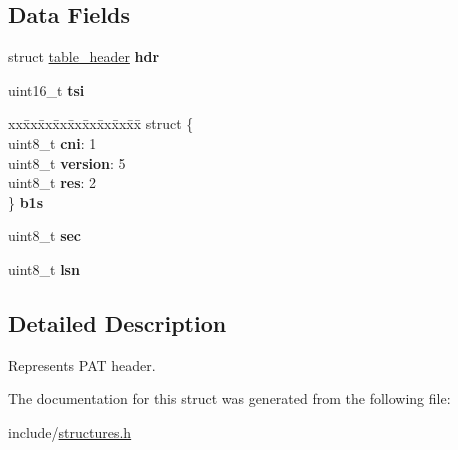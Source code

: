 \subsection*{Data Fields}
\begin{DoxyCompactItemize}
\item 
struct \hyperlink{structtable__header}{table\+\_\+header} {\bfseries hdr}\hypertarget{structpat__header_aba3506df2bd57dfea7f4eda3b31923e1}{}\label{structpat__header_aba3506df2bd57dfea7f4eda3b31923e1}

\item 
uint16\+\_\+t {\bfseries tsi}\hypertarget{structpat__header_ae911aee2f0283dfb8d45945f403a6456}{}\label{structpat__header_ae911aee2f0283dfb8d45945f403a6456}

\item 
\begin{tabbing}
xx\=xx\=xx\=xx\=xx\=xx\=xx\=xx\=xx\=\kill
struct \{\\
\>uint8\_t {\bfseries cni}: 1\\
\>uint8\_t {\bfseries version}: 5\\
\>uint8\_t {\bfseries res}: 2\\
\} {\bfseries b1s}\hypertarget{structpat__header_a212fe9c2d650280b55695b6887a87817}{}\label{structpat__header_a212fe9c2d650280b55695b6887a87817}
\\

\end{tabbing}\item 
uint8\+\_\+t {\bfseries sec}\hypertarget{structpat__header_a0bc5a3faf64ae3afcfcee271301e73f4}{}\label{structpat__header_a0bc5a3faf64ae3afcfcee271301e73f4}

\item 
uint8\+\_\+t {\bfseries lsn}\hypertarget{structpat__header_a22345d9afb7a903eab57e516128c1505}{}\label{structpat__header_a22345d9afb7a903eab57e516128c1505}

\end{DoxyCompactItemize}


\subsection{Detailed Description}
Represents P\+AT header. 

The documentation for this struct was generated from the following file\+:\begin{DoxyCompactItemize}
\item 
include/\hyperlink{structures_8h}{structures.\+h}\end{DoxyCompactItemize}
